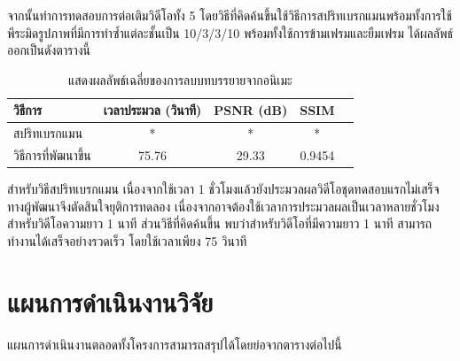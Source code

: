 \documentclass[hidelinks, a4paper,12pt]{article}
\numberwithin{equation}{section}							%
\numberwithin{equation}{section}
\begin{document}
{	\hspace{1cm}  จากนั้นทำการทดสอบการต่อเติมวิดีโอทั้ง 5 โดยวิธีที่คิดค้นขึ้นใช้วิธีการสปริทเบรกแมนพร้อมทั้งการใช้พีระมิดรูปภาพที่มีการทำซ้ำแต่ละชั้นเป็น 10/3/3/10  พร้อมทั้งใช้การข้ามเฟรมและยืมเฟรม ได้ผลลัพธ์ออกเป็นดังตารางนี้
	 
\begin{table}[H]
	\centering
	\begin{tabular}[ht]{|l|c|c|c|c|}
		\hline
		วิธีการ  & เวลาประมวล  (วินาที) & PSNR (dB) & SSIM \\
		\hline
		สปริทเบรกแมน & * & * & * \\
		วิธีการที่พัฒนาขึ้น & 75.76 & 29.33 & 0.9454 \\
		\hline
	\end{tabular}
	\caption{แสดงผลลัพธ์เฉลี่ยของการลบบทบรรยายจากอนิเมะ}
\end{table}	

\hspace{1cm} สำหรับวิธีสปริทเบรกแมน เนื่องจากใช้เวลา 1 ชั่วโมงแล้วยังประมวลผลวิดีโอชุดทดสอบแรกไม่เสร็จ ทางผู้พัฒนาจึงตัดสินใจยุติการทดลอง เนื่องจากอาจต้องใช้เวลาการประมวลผลเป็นเวลาหลายชั่วโมงสำหรับวิดีโอความยาว 1 นาที ส่วนวิธีที่คิดค้นขึ้น พบว่าสำหรับวิดีโอที่มีความยาว 1 นาที สามารถทำงานได้เสร็จอย่างรวดเร็ว โดยใช้เวลาเพียง 75 วินาที

\vspace{1cm}
	
\section{แผนการดำเนินงานวิจัย}
\hspace{1cm} แผนการดำเนินงานตลอดทั้งโครงการสามารถสรุปได้โดยย่อจากตารางต่อไปนี้
\begin{center}
\end{center}


}
\end{document}
